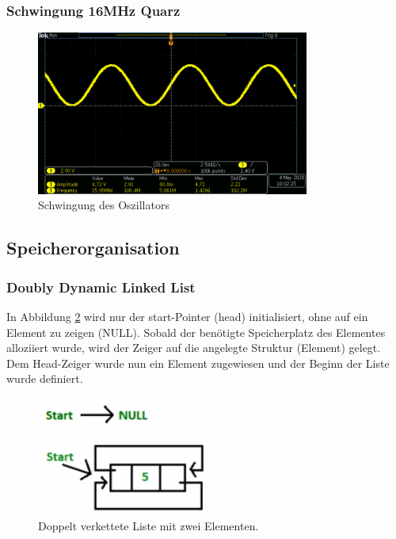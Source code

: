 \subsubsection{Schwingung 16MHz Quarz}

\begin{figure}[H]
\center
\includegraphics[width = 0.8\textwidth]{graphics/Crystal_Swing}
\caption{Schwingung des Oszillators}
\label{fig:Crystal_Swing}
\end{figure}

\subsection{Speicherorganisation}

\subsubsection{Doubly Dynamic Linked List}\label{Appendix:Lists}

In Abbildung \ref{fig:Doubly_Linked_List_2_0} wird nur der start-Pointer (head) initialisiert, ohne auf ein Element zu zeigen (NULL). Sobald der benötigte Speicherplatz des Elementes alloziiert wurde, wird der Zeiger auf die angelegte Struktur (Element) gelegt. Dem Head-Zeiger wurde nun ein Element zugewiesen und der Beginn der Liste wurde definiert.

\begin{figure}[h!]
	\centering
	\includegraphics[width=0.5\textwidth]{graphics/Doubly_Linked_List_2_0}
	\caption{Doppelt verkettete Liste mit zwei Elementen.\cite{kumar_doubly_2017}}
	\label{fig:Doubly_Linked_List_2_0}
\end{figure}

